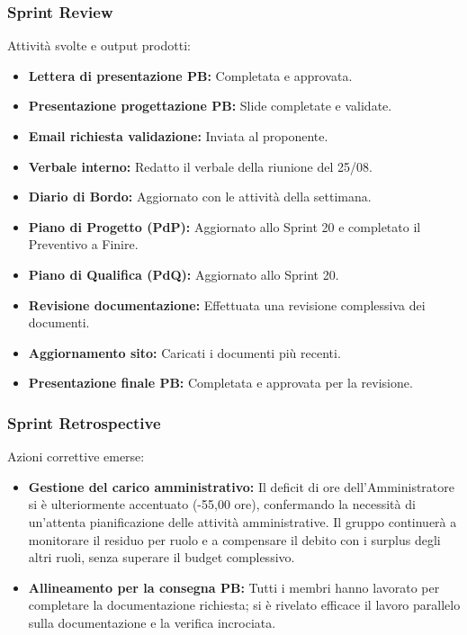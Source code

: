 \subsubsection{Sprint Review}
Attività svolte e output prodotti:
\begin{itemize}
    \item \textbf{Lettera di presentazione PB:} Completata e approvata.
    \item \textbf{Presentazione progettazione PB:} Slide completate e validate.
    \item \textbf{Email richiesta validazione:} Inviata al proponente.
    \item \textbf{Verbale interno:} Redatto il verbale della riunione del 25/08.
    \item \textbf{Diario di Bordo:} Aggiornato con le attività della settimana.
    \item \textbf{Piano di Progetto (PdP):} Aggiornato allo Sprint 20 e completato il Preventivo a Finire.
    \item \textbf{Piano di Qualifica (PdQ):} Aggiornato allo Sprint 20.
    \item \textbf{Revisione documentazione:} Effettuata una revisione complessiva dei documenti.
    \item \textbf{Aggiornamento sito:} Caricati i documenti più recenti.
    \item \textbf{Presentazione finale PB:} Completata e approvata per la revisione.
\end{itemize}

\subsubsection{Sprint Retrospective}
Azioni correttive emerse:
\begin{itemize}
    \item \textbf{Gestione del carico amministrativo:} Il deficit di ore dell'Amministratore si è ulteriormente accentuato (-55,00 ore), confermando la necessità di un'attenta pianificazione delle attività amministrative. Il gruppo continuerà a monitorare il residuo per ruolo e a compensare il debito con i surplus degli altri ruoli, senza superare il budget complessivo.
    \item \textbf{Allineamento per la consegna PB:} Tutti i membri hanno lavorato per completare la documentazione richiesta; si è rivelato efficace il lavoro parallelo sulla documentazione e la verifica incrociata.
\end{itemize}

